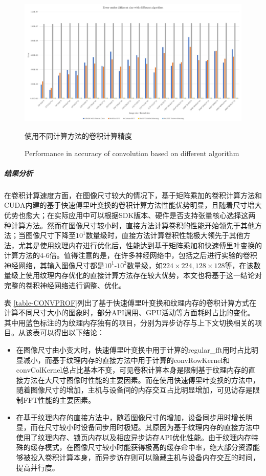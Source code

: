 \begin{figure}
	\centering
	\includegraphics[width=15cm]{figures/CONVError.jpg}
	\renewcommand{\thefigure}{\arabic{section}-\arabic{figure} }
	\renewcommand{\figurename}{图}
	\caption{使用不同计算方法的卷积计算精度}
	\addtocounter{figure}{-1}
	\renewcommand{\thefigure}{\arabic{section}-\arabic{figure} }
	\renewcommand{\figurename}{Figure}
	\caption{Performance in accuracy of convolution based on different algorithm}
	\label{Fig.CONVPr}
\end{figure}
\subparagraph{结果分析}
\par 在卷积计算速度方面，在图像尺寸较大的情况下，基于矩阵乘加的卷积计算方法和CUDA内建的基于快速傅里叶变换的卷积计算方法性能优势明显，且随着尺寸增大优势也愈大；在实际应用中可以根据SDK版本、硬件是否支持张量核心选择这两种计算方法。然而在图像尺寸较小时，直接方法计算卷积的性能开始领先于其他方法；当图像尺寸下降至$ 10^1 $数量级时，直接方法计算卷积性能极大领先于其他方法，尤其是使用纹理内存进行优化后，性能达到基于矩阵乘加和快速傅里叶变换的计算方法的4-6倍。值得注意的是，在许多神经网络中，包括之后进行实验的卷积神经网络，其输入图像尺寸都是$ 10^1 $-$ 10^2 $数量级，如$ 224\times 224, 128\times 128 $等，在该数量级上使用纹理内存优化的直接计算方法存在较大优势，本文也将基于这一结论对完整的卷积神经网络进行调整、优化。
\par 表 \ref{table-CONVPROF}列出了基于快速傅里叶变换和纹理内存的卷积计算方式在计算不同尺寸大小的图象时，部分API调用、GPU活动等方面耗时占比的变化。其中用蓝色标注的为纹理内存独有的项目，分别为异步访存与上下文切换相关的项目。从该表可以得出以下结论：
\begin{itemize}
	\item 在图像尺寸由小变大时，快速傅里叶变换中用于计算的regular\_fft用时占比明显减小，而基于纹理内存的直接方法中用于计算的convRowKernel和convColKernel总占比基本不变，可见卷积计算本身是限制基于纹理内存的直接方法在大尺寸图像时性能的主要因素。而在使用快速傅里叶变换的方法中，随着图像尺寸的增加，主机与设备间的内存交互占比明显增加，可见访存是限制FFT性能的主要因素。
	\item 在基于纹理内存的直接方法中，随着图像尺寸的增加，设备同步用时增长明显，而在尺寸较小时设备同步用时极短。其原因为基于纹理内存的直接方法中使用了纹理内存、锁页内存以及相应异步访存API优化性能。由于纹理内存特殊的缓存模式，在图像尺寸较小时能获得极高的缓存命中率，绝大部分资源能够被投入卷积计算本身，而异步访存则可以隐藏主机与设备内存交互的时间，提高并行度。
\end{itemize}
